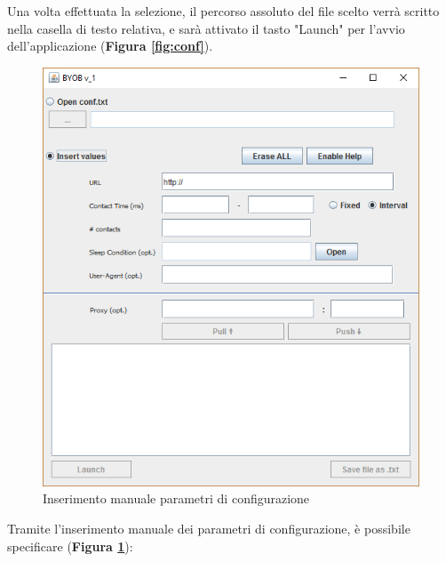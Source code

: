 Una volta effettuata la selezione, il percorso assoluto del file scelto verr\`{a} scritto nella casella di testo relativa, e sar\`{a} attivato il tasto "Launch" per l'avvio dell'applicazione (\textbf{Figura \ref{fig:conf}}).

\begin{figure}[!htb]
        \centering        
        \includegraphics[width=0.7\linewidth]{./imgs/gui2}
        \caption{Inserimento manuale parametri di configurazione}
        \label{fig:manual}
\end{figure}

Tramite l'inserimento manuale dei parametri di configurazione, \`{e} possibile specificare (\textbf{Figura \ref{fig:manual}}):

